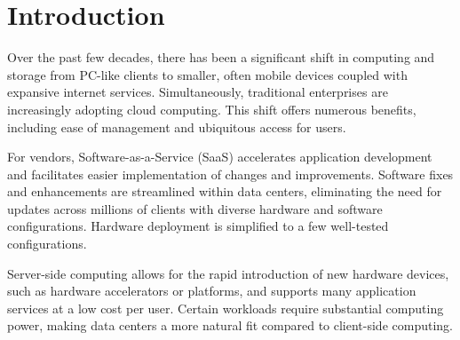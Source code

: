 \section{Introduction}

Over the past few decades, there has been a significant shift in computing and storage from PC-like clients to smaller, often mobile devices coupled with expansive internet services. 
Simultaneously, traditional enterprises are increasingly adopting cloud computing. This shift offers numerous benefits, including ease of management and ubiquitous access for users.

For vendors, Software-as-a-Service (SaaS) accelerates application development and facilitates easier implementation of changes and improvements. 
Software fixes and enhancements are streamlined within data centers, eliminating the need for updates across millions of clients with diverse hardware and software configurations. 
Hardware deployment is simplified to a few well-tested configurations.

Server-side computing allows for the rapid introduction of new hardware devices, such as hardware accelerators or platforms, and supports many application services at a low cost per user. 
Certain workloads require substantial computing power, making data centers a more natural fit compared to client-side computing.

